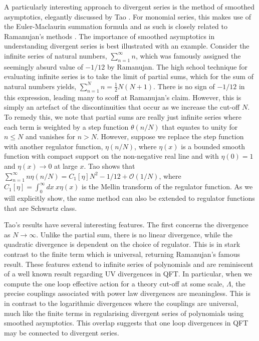 \documentclass[12pt, letter]{article}
\begin{document}
A particularly interesting approach to divergent series is the method of smoothed asymptotics, elegantly discussed by Tao \citep{Tao11}.  For monomial series, this makes use of the Euler-Maclaurin summation formula and as such is closely related to Ramanujan's methods \citep{Berndt85,Hardy73}. The importance of smoothed asymptotics in understanding divergent series is best illustrated with an example. Consider the infinite series of natural numbers, $\sum_{n=1}^\infty n$, which was famously assigned the seemingly absurd value of $-1/12$  by Ramanujan. The high school technique for evaluating infinite series is to take the limit of partial sums, which for the sum of natural numbers yields, $\sum_{n=1}^N n = \frac{1}{2} N (N+1)$. There is no sign of $-1/12$ in this expression, leading many to scoff at Ramanujan's claim. However, this is simply an artefact of the discontinuities that occur as we increase the cut-off $N$. To remedy this, we note that partial sums are really just infinite series where each term is weighted by a step function $\theta(n/N)$ that equates to unity for $n\leq N$ and vanishes for $n>N$. However,  suppose we replace the step function with another regulator function, $\eta(n/N)$, where $\eta(x)$ is a bounded smooth function with compact support on the non-negative real line and with $\eta(0)=1$ and $\eta(x) \to 0$ at large $x$. Tao shows that $\sum_{n=1}^\infty n \eta(n/N) = C_1[\eta] N^2-1/12+\mathcal{O}(1/N)$, where  $C_1[\eta]=\int_0^\infty dx \ x \eta(x)$ is the Mellin transform of the regulator function.  As we  will  explicitly show, the same method can also be extended to regulator functions that are Schwartz class.

Tao's results have several interesting features. The first concerns the divergence as $N \to \infty$. Unlike the partial sum, there is no linear divergence, while the quadratic divergence is dependent on the choice of regulator. This is in stark contrast to the finite term which is universal, returning Ramanujan's famous result.  These features extend to infinite series of polynomials and are reminiscent of a well known result regarding UV divergences in QFT. In particular, when we compute the one loop effective action for a theory cut-off at some scale, $\Lambda$, the precise couplings associated with power law divergences are meaningless. This is in contrast to the logarithmic divergences where the couplings are universal, much like the finite terms in regularising divergent series of polynomials using smoothed asymptotics. This overlap suggests that one loop  divergences in QFT may be connected to divergent series. 
\end{document}
